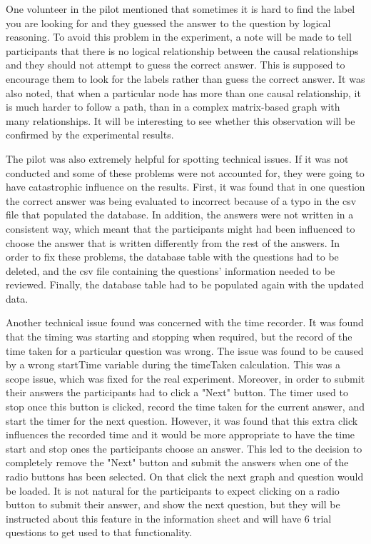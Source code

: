 \documentclass{l4proj}
\begin{document}
One volunteer in the pilot mentioned that sometimes it is hard to find the label you are looking for and they guessed the answer to the question by logical reasoning. To avoid this problem in the experiment, a note will be made to tell participants that there is no logical relationship between the causal relationships and they should not attempt to guess the correct answer. This is supposed to encourage them to look for the labels rather than guess the correct answer. It was also noted, that when a particular node has more than one causal relationship, it is much harder to follow a path, than in a complex matrix-based graph with many relationships. It will be interesting to see whether this observation will be confirmed by the experimental results.

The pilot was also extremely helpful for spotting technical issues. If it was not conducted and some of these problems were not accounted for, they were going to have catastrophic influence on the results. First, it was found that in one question the correct answer was being evaluated to incorrect because of a typo in the csv file that populated the database. In addition, the answers were not written in a consistent way, which meant that the participants might had been influenced to choose the answer that is written differently from the rest of the answers. In order to fix these problems, the database table with the questions had to be deleted, and the csv file containing the questions' information needed to be reviewed. Finally, the database table had to be populated again with the updated data. 

Another technical issue found was concerned with the time recorder. It was found that the timing was starting and stopping when required, but the record of the time taken for a particular question was wrong. The issue was found to be caused by a wrong startTime variable during the timeTaken calculation. This was a scope issue, which was fixed for the real experiment. Moreover, in order to submit their answers the participants had to click a "Next" button. The timer used to stop once this button is clicked, record the time taken for the current answer, and start the timer for the next question. However, it was found that this extra click influences the recorded time and it would be more appropriate to have the time start and stop ones the participants choose an answer. This led to the decision to completely remove the "Next" button and submit the answers when one of the radio buttons has been selected. On that click the next graph and question would be loaded. It is not natural for the participants to expect clicking on a radio button to submit their answer, and show the next question, but they will be instructed about this feature in the information sheet and will have 6 trial questions to get used to that functionality. 
 
\end{document}
